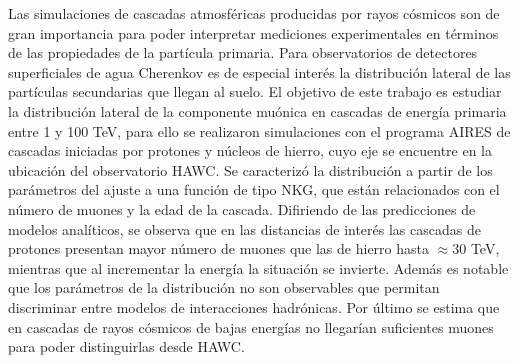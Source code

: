 
Las simulaciones de cascadas atmosf\'ericas producidas por rayos c\'osmicos son de gran importancia para poder interpretar mediciones experimentales en t\'erminos de las propiedades de la part\'icula primaria. Para observatorios de detectores superficiales de agua Cherenkov es de especial inter\'es la distribuci\'on lateral de las part\'iculas secundarias que llegan al suelo. El objetivo de este trabajo es estudiar la distribuci\'on lateral de la componente mu\'onica en cascadas de energ\'ia primaria entre 1 y 100 TeV, para ello se realizaron simulaciones con el programa AIRES de cascadas iniciadas por protones y n\'ucleos de hierro, cuyo eje se encuentre en la ubicaci\'on del observatorio HAWC. Se caracteriz\'o la distribuci\'on a partir de los par\'ametros del ajuste a una funci\'on de tipo NKG, que est\'an relacionados con el n\'umero de muones y la edad de la cascada. Difiriendo de las predicciones de modelos anal\'iticos, se observa que en las distancias de inter\'es las cascadas de protones presentan mayor n\'umero de muones que las de hierro hasta $\approx 30$ TeV, mientras que al incrementar la energ\'ia la situaci\'on se invierte. Adem\'as es notable que los par\'ametros de la distribuci\'on no son observables que permitan discriminar entre modelos de interacciones hadr\'onicas. Por \'ultimo se estima que en cascadas de rayos c\'osmicos de bajas energ\'ias no llegar\'ian suficientes muones para poder distinguirlas desde HAWC.


 
\singlespacing